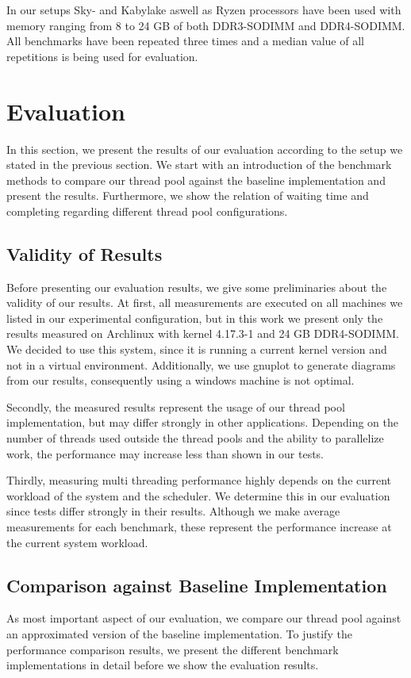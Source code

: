\documentclass[conference]{IEEEtran}
\begin{document}
In our setups Sky- and Kabylake aswell as Ryzen processors have been used with memory
ranging from 8 to 24 GB of both DDR3-SODIMM and DDR4-SODIMM. 
All benchmarks have been repeated three times and a median value of all
repetitions is being used for evaluation.

\section{Evaluation}\label{sec:eval}
In this section, we present the results of our evaluation according to the setup we stated in the previous section. We start with an introduction of the benchmark methods to compare our thread pool against the baseline implementation and present the results. Furthermore, we show the relation of waiting time and completing regarding different thread pool configurations.

\subsection{Validity of Results} 
Before presenting our evaluation results, we
give some preliminaries about the validity of our results. At first, all
measurements are executed on all machines we listed in our experimental
configuration, but in this work we present only the results measured on
Archlinux with kernel 4.17.3-1 and 24 GB DDR4-SODIMM. We decided to use this
system, since it is running a current kernel version and not in a virtual
environment. Additionally, we use gnuplot to generate diagrams from our results,
consequently using a windows machine is not optimal.

Secondly, the measured results represent the usage of our thread pool implementation, but may differ strongly in other applications. Depending on the number of threads used outside the thread pools and the ability to parallelize work, the performance may increase less than shown in our tests.

Thirdly, measuring multi threading performance highly depends on the current workload of the system and the scheduler. We determine this in our evaluation since tests differ strongly in their results. Although we make average measurements for each benchmark, these represent the performance increase at the current system workload.

\subsection{Comparison against Baseline Implementation}
As most important aspect of our evaluation, we compare our thread pool against an approximated version of the baseline implementation. To justify the performance comparison results, we present the different benchmark implementations in detail before we show the evaluation results.
\end{document}
